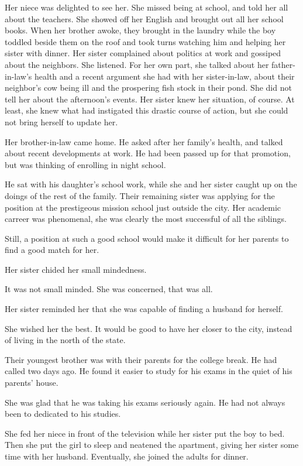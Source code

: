 \documentclass{article}
\begin{document}
Her niece was delighted to see her. She missed being at school, and told her all about the teachers. She showed off her English and brought out all her school books. When her brother awoke, they brought in the laundry while the boy toddled beside them on the roof and took turns watching him and helping her sister with dinner. Her sister complained about politics at work and gossiped about the neighbors. She listened. For her own part, she talked about her father-in-law's health and a recent argument she had with her sister-in-law, about their neighbor's cow being ill and the prospering fish stock in their pond. She did not tell her about the afternoon's events. Her sister knew her situation, of course. At least, she knew what had instigated this drastic course of action, but she could not bring herself to update her.

Her brother-in-law came home. He asked after her family's health, and talked about recent developments at work. He had been passed up for that promotion, but was thinking of enrolling in night school. 

He sat with his daughter's school work, while she and her sister caught up on the doings of the rest of the family. Their remaining sister was applying for the position at the prestigeous mission school just outside the city. Her academic carreer was phenomenal, she was clearly the most successful of all the siblings. 

Still, a position at such a good school would make it difficult for her parents to find a good match for her. 

Her sister chided her small mindedness. 

It was not small minded. She was concerned, that was all. 

Her sister reminded her that she was capable of finding a husband for herself. 

She wished her the best. It would be good to have her closer to the city, instead of living in the north of the state. 

Their youngest brother was with their parents for the college break. He had called two days ago. He found it easier to study for his exams in the quiet of his parents' house. 

She was glad that he was taking his exams seriously again. He had not always been to dedicated to his studies.

She fed her niece in front of the television while her sister put the boy to bed. Then she put the girl to sleep and neatened the apartment, giving her sister some time with her husband. Eventually, she joined the adults for dinner.
 
\end{document}
